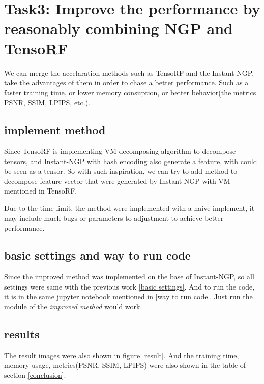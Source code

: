 \section{Task3: Improve the performance by reasonably combining NGP and TensoRF}

We can merge the accelaration methods such as TensoRF and the Instant-NGP, take the advantages of them in order to chase a better performance. Such as a faster training time, or lower memory consuption, or better behavior(the metrics PSNR, SSIM, LPIPS, etc.).

\subsection{implement method}

Since TensoRF is implementing VM decomposing algorithm to decompose tensors, and Instant-NGP with hash encoding also generate a feature, with could be seen as a tensor. So with such inspiration, we can try to add method to decompose feature vector that were generated by Instant-NGP with VM mentioned in TensoRF.

Due to the time limit, the method were implemented with a naive implement, it may include much bugs or parameters to adjustment to achieve better performance.

\subsection{basic settings and way to run code}
Since the improved method was implemented on the base of Instant-NGP, so all settings were same with the previous work \ref{basic settings}. And to run the code, it is in the same jupyter notebook mentioned in \ref{way to run code}. Just run the module of the \textit{improved method} would work.

\subsection{results}

The result images were also shown in figure \ref{result}. And the training time, memory usage, metrics(PSNR, SSIM, LPIPS) were also shown in the table of section \ref{conclusion}.
